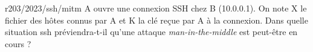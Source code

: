 \begin{question}{r203/2023/ssh/mitm}
  A ouvre une connexion SSH chez B (10.0.0.1). On note X le fichier
  des hôtes connus par A et K la clé reçue par A à la connexion. Dans
  quelle situation ssh préviendra-t-il qu'une attaque {\em
    man-in-the-middle} est peut-être en cours ?
  \begin{reponses}[2]
    \lastchoices
  \end{reponses}
\end{question}
